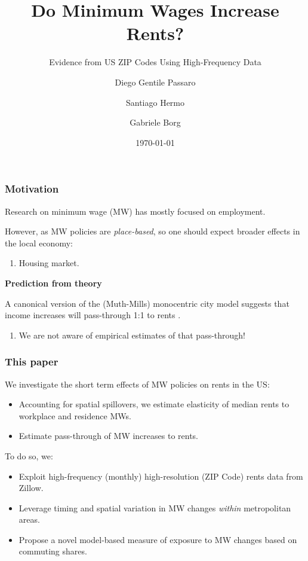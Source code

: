 \documentclass[aspectratio=169, t]{beamer}
\title{Do Minimum Wages Increase Rents?}
\subtitle{Evidence from US ZIP Codes Using High-Frequency Data}
\date{\today}
\author{Diego Gentile Passaro \and Santiago Hermo \and Gabriele Borg}
\institute{Brown University $ \quad\quad\quad\quad $ Brown University $ \quad\quad\quad\quad$  AWS}
\begin{document}
\maketitle



\begin{frame}
	\frametitle{Motivation}
	
	Research on minimum wage (MW) has mostly focused on employment.
	
	\vspace{1.5mm}

	However, as MW policies are \textit{place-based}, so one should expect broader effects 
	in the local economy:
	\begin{enumerate}[$\Rightarrow$]
		\item Housing market.
	\end{enumerate}

	\pause
	\vspace{3mm}
	\textbf{Prediction from theory}
	
    A canonical version of the (Muth-Mills) monocentric city model suggests that income increases will 
    pass-through 1:1 to rents \parencite{Brueckner1987}.  
    	\begin{enumerate}[$\Rightarrow$]
		\item We are not aware of empirical estimates of that pass-through!
	\end{enumerate}
\end{frame}

\begin{frame}
	\frametitle{This paper}
	We investigate the short term effects of MW policies on rents in the US:
	\begin{itemize}
		\vspace{.5mm} \item Accounting for spatial spillovers, we estimate 
		elasticity of median rents to workplace and residence MWs.
		\vspace{.5mm} \item Estimate pass-through of MW increases to rents.
	\end{itemize}
	
	\vspace{3mm}
	\pause
	To do so, we:
	\begin{itemize}
    	\vspace{.5mm} \item Exploit high-frequency (monthly) high-resolution 
    	(ZIP Code) rents data from Zillow.
    	\vspace{.5mm} \item Leverage timing and spatial variation in MW changes 
    	\textit{within} metropolitan areas.
    	\vspace{.5mm} \item Propose a novel model-based measure of exposure to MW changes based on 
    	commuting shares.
	\end{itemize}
\end{frame}
\end{document}
